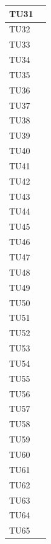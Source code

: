 \begin{longtable}{ | >{\centering\arraybackslash}m{5cm} | >{\centering\arraybackslash}m{5cm} | }
				TU31	&	\done{}	\\ \hline
				TU32 	&	\done{}	\\ \hline
				TU33 	&	\done{}	\\ \hline
				TU34	&	\done{}	\\ \hline
				TU35 	&	\done{}	\\ \hline
				TU36	&	\done{}	\\ \hline
				TU37	&	\done{}	\\ \hline
				TU38	&	\done{}	\\ \hline
				TU39 	&	\done{}	\\ \hline
				TU40	&	\done{}	\\ \hline
				TU41	&	\done{}	\\ \hline
				TU42	&	\done{}	\\ \hline
				TU43	&	\done{}	\\ \hline
				TU44 	&	\done{}	\\ \hline
				TU45	&	\done{} 	\\ \hline
				TU46 	&	\done{} 	\\ \hline
				TU47	&	\done{}	\\ \hline
				TU48 	&	\done{} 	\\ \hline
				TU49 	&	\done{} 	\\ \hline
				TU50 	&	\done{} 	\\ \hline
				TU51	&	\done{}	\\ \hline
				TU52 	&	\done{}	\\ \hline
				TU53 	&	\done{}	\\ \hline
				TU54	&	\done{}	\\ \hline

				TU55 	&	\done{} 	\\ \hline
				TU56	&	\done{}	\\ \hline
				TU57 	&	\done{}	\\ \hline
				TU58 	&	\done{}	\\ \hline
				TU59	&	\done{}	\\ \hline

				TU60 	&	\done{} 	\\ \hline
				TU61	&	\done{}	\\ \hline
				TU62 	&	\done{}	\\ \hline
				TU63 	&	\done{}	\\ \hline
				TU64	&	\done{}	\\ \hline

				TU65 	&	\done{} 	\\ \hline


\end{longtable}
